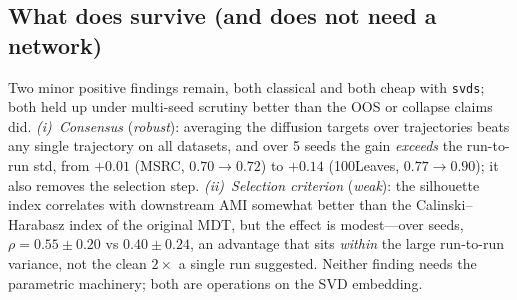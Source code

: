 \documentclass[10pt,twocolumn]{article}
\begin{document}
\begin{table}[t]\centering\footnotesize
\caption{Controlled dense-vs-sparse kernel ablation ($t{=}4$, $\tau{=}20$; identity init, max-min
bandwidth, all else fixed; AMI). ``init'' = untrained operator. Both kernels' untrained operators match
fixed MDT---\emph{neither collapses}; training degrades both far below init; dense $\approx$ sparse. The
failure is the objective, not the kernel.}
\label{tab:collapse-ablation}
\setlength{\tabcolsep}{5pt}
\end{table}

\subsection{What does survive (and does not need a network)}
Two minor positive findings remain, both classical and both cheap with \texttt{svds}; both held up
under multi-seed scrutiny better than the OOS or collapse claims did.
\emph{(i)~Consensus} (\emph{robust}): averaging the diffusion targets over trajectories beats any
single trajectory on all datasets, and over 5 seeds the gain \emph{exceeds} the run-to-run std,
from $+0.01$ (MSRC, $0.70{\to}0.72$) to $+0.14$ (100Leaves, $0.77{\to}0.90$); it also removes the
selection step.
\emph{(ii)~Selection criterion} (\emph{weak}): the silhouette index correlates with downstream AMI
somewhat better than the Calinski--Harabasz index of the original MDT, but the effect is modest---over
seeds, $\rho=0.55\pm0.20$ vs $0.40\pm0.24$, an advantage that sits \emph{within} the large run-to-run
variance, not the clean $2\times$ a single run suggested. Neither finding needs the parametric
machinery; both are operations on the SVD embedding.
\end{document}
